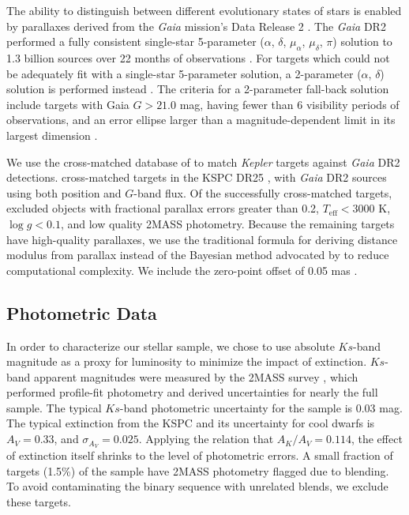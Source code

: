 \documentclass[twocolumn]{aastex6}
\newcommand{\Kepler}{\mbox{\textit{Kepler}}}
\newcommand{\Gaia}{\mbox{\textit{Gaia}}}
\newcommand{\Teff}{\ensuremath{T_{\textrm{eff}}}}
\newcommand{\logg}{\ensuremath{\log g}}
\begin{document}
The ability to distinguish between different evolutionary states of stars is
enabled by parallaxes derived from the \Gaia{} mission's Data Release 2
\citep{Gaia18}. The \Gaia{} DR2 performed a fully consistent single-star
5-parameter (\(\alpha\), \(\delta\), \(\mu_\alpha\), \(\mu_\delta\), \(\pi\))
solution to 1.3 billion sources over 22 months of observations
\citep{Lindegren18}. For targets which could not be adequately fit with a
single-star 5-parameter solution, a 2-parameter (\(\alpha\), \(\delta\))
solution is performed instead \citep{Michalik15}. The criteria for a
2-parameter fall-back solution include targets with Gaia \(G > 21.0\) mag, 
having fewer than 6 visibility periods of observations, and an error ellipse 
larger than a magnitude-dependent limit in its largest dimension 
\citep{Lindegren18}.

We use the cross-matched database of \citet{Berger18b} to match \Kepler{} targets
against \Gaia{} DR2 detections.
\citet{Berger18b} cross-matched targets in the KSPC DR25 \citep{Mathur17}, 
with \Gaia{} DR2 sources using both position and \(G\)-band flux. Of the 
successfully cross-matched targets, \citet{Berger18b} excluded objects with 
fractional parallax errors greater than 0.2, \(\Teff < 3000\) K, 
\(\logg < 0.1\), and low quality 2MASS photometry.  Because the remaining
targets have high-quality parallaxes, we use the traditional 
formula for deriving distance modulus from parallax instead of the Bayesian 
method advocated by \citet{Luri18} to reduce computational complexity. We
include the zero-point offset of 0.05 mas \citep{Zinn18}.

\subsection{Photometric Data}

In order to characterize our stellar sample, we chose to use absolute 
\(Ks\)-band magnitude as a proxy for luminosity to minimize the impact of 
extinction.  \(Ks\)-band apparent magnitudes were measured by the 2MASS survey 
\citep{Skrutskie06}, which performed profile-fit photometry and derived 
uncertainties for nearly the full sample.  The typical \(Ks\)-band 
photometric uncertainty for the \citet{McQuillan14} sample is 0.03 mag. The 
typical extinction from the KSPC and its uncertainty for cool dwarfs is 
\(A_V = 0.33\), and \(\sigma_{A_V}=0.025\). Applying the \citet{Cardelli89} 
relation that \(A_K/A_V = 0.114\), the effect of extinction itself shrinks to 
the level of photometric errors.  A small fraction of targets (1.5\%) of the 
\citet{McQuillan14} sample have 2MASS photometry flagged due to blending. To 
avoid contaminating the binary sequence with unrelated blends, we exclude 
these targets.
\end{document}
